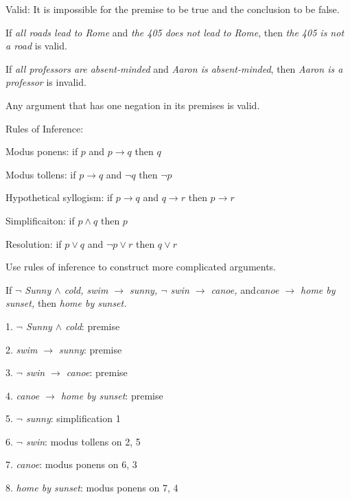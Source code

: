 \begin{defn}

Valid: It is impossible for the premise to be true and the conclusion to be false.

\end{defn}

\begin{ex}

If \textit{all roads lead to Rome} and \textit{the 405 does not lead to Rome}, then \textit{the 405 is not a road} is valid.

\end{ex}

\begin{ex}

If \textit{all professors are absent-minded} and \textit{Aaron is absent-minded}, then \textit{Aaron is a professor} is invalid.

\end{ex}

\begin{remark}

Any argument that has one negation in its premises is valid.

\end{remark}

Rules of Inference:

Modus ponens: if $p$ and $p \rightarrow q$ then $q$

Modus tollens: if $p \rightarrow q$ and $\lnot q$ then $\lnot p$

Hypothetical syllogism: if $p \rightarrow q$ and $q \rightarrow r$ then $p \rightarrow r$

Simplificaiton: if $p \land q$ then $p$

Resolution: if $p \lor q$ and $\lnot p \lor r$ then $q \lor r$

Use rules of inference to construct more complicated arguments.

\begin{ex}

If \textit{$\lnot$ Sunny $\land$ cold, swim $\rightarrow$ sunny, $\lnot$ swin $\rightarrow$ canoe, }and\textit{canoe $\rightarrow$ home by sunset, }then \textit{home by sunset.}

1. \textit{$\lnot$ Sunny $\land$ cold}: premise

2. \textit{swim $\rightarrow$ sunny}: premise

3. \textit{$\lnot$ swin $\rightarrow$ canoe}: premise

4. \textit{canoe $\rightarrow$ home by sunset}: premise

5. \textit{$\lnot$ sunny}: simplification 1

6. \textit{$\lnot$ swin}: modus tollens on 2, 5

7. \textit{canoe}: modus ponens on 6, 3

8. \textit{home by sunset}: modus ponens on 7, 4

\end{ex}



